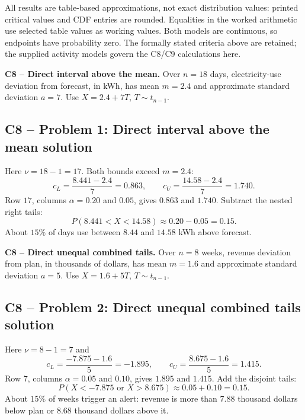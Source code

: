 All results are table-based approximations, not exact distribution values: printed critical values and CDF entries are rounded.
Equalities in the worked arithmetic use selected table values as working values.
Both models are continuous, so endpoints have probability zero.
The formally stated criteria above are retained; the supplied activity models govern the C8/C9 calculations here.


{
\textbf{C8 -- Direct interval above the mean.} Over $n=18$ days, electricity-use deviation from forecast, in kWh, has mean $m=2.4$ and approximate standard deviation $a=7$. Use $X=2.4+7T$, $T\sim t_{n-1}$.
\label{sol:q1}
\subsection*{C8 -- Problem 1: Direct interval above the mean solution }
Here $\nu=18-1=17$. Both bounds exceed $m=2.4$:
\[
 c_L=\frac{8.441-2.4}{7}=0.863,\qquad c_U=\frac{14.58-2.4}{7}=1.740.
\]
Row $17$, columns $\alpha=0.20$ and $0.05$, gives $0.863$ and $1.740$.
Subtract the nested right tails:
\[
 P(8.441<X<14.58)\approx0.20-0.05=\boxed{0.15}.
\]
About $15\%$ of days use between $8.44$ and $14.58$ kWh above forecast.
\secInicio[sec:q1]
}

{
\textbf{C8 -- Direct unequal combined tails.} Over $n=8$ weeks, revenue deviation from plan, in thousands of dollars, has mean $m=1.6$ and approximate standard deviation $a=5$. Use $X=1.6+5T$, $T\sim t_{n-1}$.
\label{sol:q2}
\subsection*{C8 -- Problem 2: Direct unequal combined tails solution }
Here $\nu=8-1=7$ and
\[
 c_L=\frac{-7.875-1.6}{5}=-1.895,\qquad c_U=\frac{8.675-1.6}{5}=1.415.
\]
Row $7$, columns $\alpha=0.05$ and $0.10$, gives $1.895$ and $1.415$.
Add the disjoint tails:
\[
 P(X<-7.875\text{ or }X>8.675)\approx0.05+0.10=\boxed{0.15}.
\]
About $15\%$ of weeks trigger an alert: revenue is more than $7.88$ thousand dollars below plan or $8.68$ thousand dollars above it.
\secInicio[sec:q2]
}

